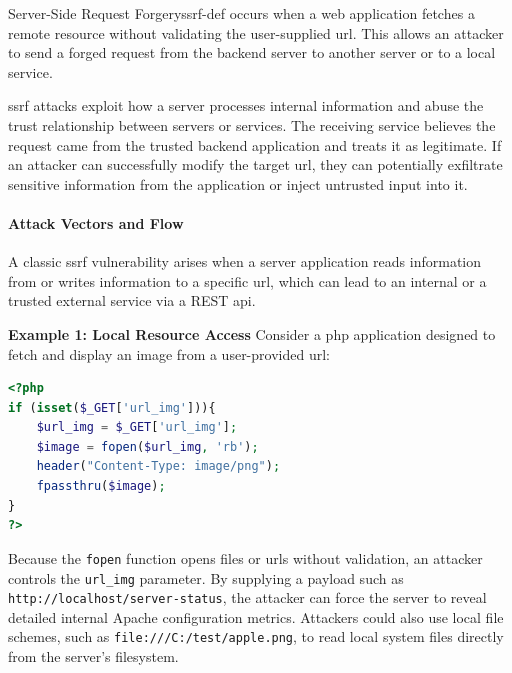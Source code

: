 \begin{definition}{Server-Side Request Forgery}{ssrf-def}
     occurs when a web application fetches a remote resource without validating the user-supplied \gls{url}. This allows an attacker to send a forged request from the backend server to another server or to a local service.
\end{definition}

\gls{ssrf} attacks exploit how a server processes internal information and abuse the trust relationship between servers or services. The receiving service believes the request came from the trusted backend application and treats it as legitimate. If an attacker can successfully modify the target \gls{url}, they can potentially exfiltrate sensitive information from the application or inject untrusted input into it.

\paragraph{ Attack Vectors and Flow}
A classic \gls{ssrf} vulnerability arises when a server application reads information from or writes information to a specific \gls{url}, which can lead to an internal or a trusted external service via a REST \gls{api}.

\textbf{Example 1: Local Resource Access}
Consider a \gls{php} application designed to fetch and display an image from a user-provided \gls{url}:
\begin{lstlisting}[language=PHP]
<?php
if (isset($_GET['url_img'])){
    $url_img = $_GET['url_img'];
    $image = fopen($url_img, 'rb');
    header("Content-Type: image/png");
    fpassthru($image);
}
?>
\end{lstlisting}
Because the \texttt{fopen} function opens files or \glspl{url} without validation, an attacker controls the \texttt{url\_img} parameter. By supplying a payload such as \texttt{http://localhost/server-status}, the attacker can force the server to reveal detailed internal Apache configuration metrics. Attackers could also use local file schemes, such as \texttt{file:///C:/test/apple.png}, to read local system files directly from the server's filesystem.


